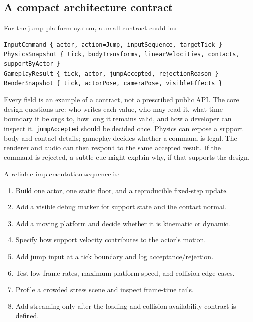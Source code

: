 \subsection{A compact architecture contract}\label{06-engine-ii-ch041-a-compact-architecture-contract}

For the jump-platform system, a small contract could be:

\begin{verbatim}
InputCommand { actor, action=Jump, inputSequence, targetTick }
PhysicsSnapshot { tick, bodyTransforms, linearVelocities, contacts, supportByActor }
GameplayResult { tick, actor, jumpAccepted, rejectionReason }
RenderSnapshot { tick, actorPose, cameraPose, visibleEffects }
\end{verbatim}

Every field is an example of a contract, not a prescribed public API. The core design questions are: who writes each value, who may read it, what time boundary it belongs to, how long it remains valid, and how a developer can inspect it. \texttt{jumpAccepted} should be decided once. Physics can expose a support body and contact details; gameplay decides whether a command is legal. The renderer and audio can then respond to the same accepted result. If the command is rejected, a subtle cue might explain why, if that supports the design.

A reliable implementation sequence is:

\begin{enumerate}
\def\labelenumi{\arabic{enumi}.}
\tightlist
\item
  Build one actor, one static floor, and a reproducible fixed-step update.
\item
  Add a visible debug marker for support state and the contact normal.
\item
  Add a moving platform and decide whether it is kinematic or dynamic.
\item
  Specify how support velocity contributes to the actor's motion.
\item
  Add jump input at a tick boundary and log acceptance/rejection.
\item
  Test low frame rates, maximum platform speed, and collision edge cases.
\item
  Profile a crowded stress scene and inspect frame-time tails.
\item
  Add streaming only after the loading and collision availability contract is defined.
\end{enumerate}

